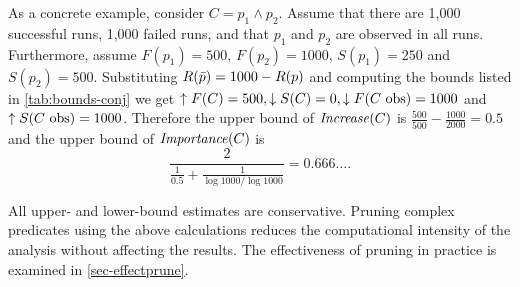 As a concrete example, consider $C = p_1 \wedge p_2$.  Assume that there are 1,000
successful runs, 1,000 failed runs, and that $p_1$ and $p_2$ are observed in all runs.
Furthermore, assume
$F(p_1) = 500$, $F(p_2) = 1000$, $S(p_1) = 250$ and $S(p_2) = 500$.
Substituting $R(\text{$\bar{p}$}) = 1000 - R(p)$ and computing the bounds listed in
\autoref{tab:bounds-conj} we get $\uparrow F(C) = 500, \downarrow S(C) = 0, \downarrow F(\text{$C$ obs}) = 1000$ and
$\uparrow S(\text{$C$ obs}) = 1000$.  Therefore the upper bound of $\mathit{Increase}(C)$ is
$\frac{500}{500} - \frac{1000}{2000}=0.5$ and the upper bound of $\mathit{Importance}(C)$ is
\begin{equation*}
\frac{2}{\frac{1}{0.5}+\frac{1}{\log{1000}/\log{1000}}} = 0.666\dots.
\end{equation*}

All upper- and lower-bound estimates are conservative.  Pruning complex predicates using the above calculations reduces the computational intensity of the analysis without affecting the results.  The effectiveness of pruning in practice is examined in \autoref{sec-effectprune}.

